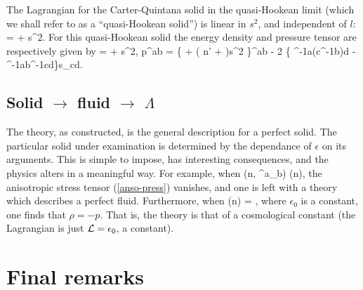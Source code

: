 The Lagrangian for the Carter-Quintana solid in the  quasi-Hookean limit (which we shall refer to as a ``quasi-Hookean solid'') is linear in $s^2$, and independent of $l$:
\bea
{} = \check{\epsilon} + s^2.
\eea
For this quasi-Hookean solid the energy density and pressure tensor are respectively given by
\bse
\bea
\rho = \check{\rho} + \mu s^2,
\eea
\bea
p^{ab} = \left\{  + \left( n\mu' + \mu\right)s^2 \right\}\gamma^{ab} - 2 \mu\left\{  \eta^{-1a(c}\eta^{-1b)d} - \eta^{-1ab}\eta^{-1cd}\right\}s_{cd}.
\eea
\ese

\subsection{Solid $\rightarrow$ fluid $\rightarrow$ $\Lambda$}
The theory, as constructed, is the general description for a perfect solid. The particular solid under examination is determined by the dependance of $\epsilon$ on its   arguments. This is simple to impose,   has interesting consequences, and  the physics alters in a meaningful way.  For example, when
\bea
\epsilon\left(n, {\eta^a}_b\right) \longrightarrow \epsilon(n),
\eea
  the anisotropic stress tensor (\ref{anso-press}) vanishes, and one is left with a theory which describes a perfect fluid. Furthermore, when 
\bea
\epsilon(n) = ,
\eea
where $\epsilon_0$ is a constant, one finds that $\rho = - p$.  That is, the theory is that of a cosmological constant (the Lagrangian is just $\mathcal{L} = \epsilon_0$, a constant).

\section{Final remarks}